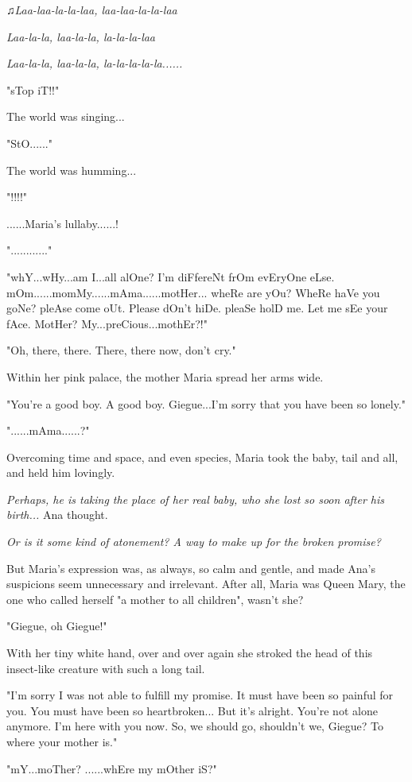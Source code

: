 \documentclass[
]{article}
\begin{document}
\emph{♫Laa-laa-la-la-laa, laa-laa-la-la-laa}

\emph{Laa-la-la, laa-la-la, la-la-la-laa}

\emph{Laa-la-la, laa-la-la, la-la-la-la-la......}

"sTop iT!!"

The world was singing...

"StO......"

The world was humming...

"!!!!"

......Maria's lullaby......!

"............"

"whY...wHy...am I...all alOne? I'm diFfereNt frOm evEryOne eLse.
mOm......momMy......mAma......motHer... wheRe are yOu? WheRe haVe you
goNe? pleAse come oUt. Please dOn't hiDe. pleaSe holD me. Let me sEe
your fAce. MotHer? My...preCious...mothEr?!"

"Oh, there, there. There, there now, don't cry."

Within her pink palace, the mother Maria spread her arms wide.

"You're a good boy. A good boy. Giegue...I'm sorry that you have been so
lonely."

"......mAma......?"

Overcoming time and space, and even species, Maria took the baby, tail
and all, and held him lovingly.

\emph{Perhaps, he is taking the place of her real baby, who she lost so
soon after his birth...} Ana thought.

\emph{Or is it some kind of atonement? A way to make up for the broken
promise?}

But Maria's expression was, as always, so calm and gentle, and made
Ana's suspicions seem unnecessary and irrelevant. After all, Maria was
Queen Mary, the one who called herself "a mother to all children",
wasn't she?

"Giegue, oh Giegue!"

With her tiny white hand, over and over again she stroked the head of
this insect-like creature with such a long tail.

"I'm sorry I was not able to fulfill my promise. It must have been so
painful for you. You must have been so heartbroken... But it's alright.
You're not alone anymore. I'm here with you now. So, we should go,
shouldn't we, Giegue? To where your mother is."

"mY...moTher? ......whEre my mOther iS?"
\end{document}
